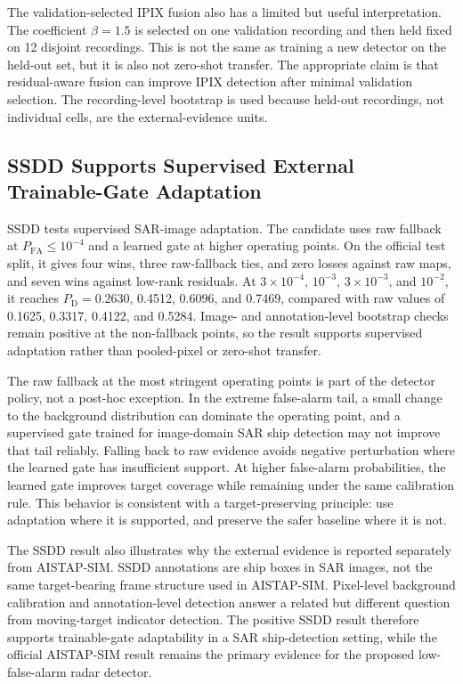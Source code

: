 \documentclass[journal]{IEEEtran}
\begin{document}
The validation-selected IPIX fusion also has a limited but useful interpretation. The coefficient $\beta=1.5$ is selected on one validation recording and then held fixed on 12 disjoint recordings. This is not the same as training a new detector on the held-out set, but it is also not zero-shot transfer. The appropriate claim is that residual-aware fusion can improve IPIX detection after minimal validation selection. The recording-level bootstrap is used because held-out recordings, not individual cells, are the external-evidence units.

\subsection{SSDD Supports Supervised External Trainable-Gate Adaptation}

SSDD tests supervised SAR-image adaptation. The candidate uses raw fallback at $P_{\mathrm{FA}}\leq10^{-4}$ and a learned gate at higher operating points. On the official test split, it gives four wins, three raw-fallback ties, and zero losses against raw maps, and seven wins against low-rank residuals. At $3\times10^{-4}$, $10^{-3}$, $3\times10^{-3}$, and $10^{-2}$, it reaches $P_{\mathrm{D}}=0.2630$, 0.4512, 0.6096, and 0.7469, compared with raw values of 0.1625, 0.3317, 0.4122, and 0.5284. Image- and annotation-level bootstrap checks remain positive at the non-fallback points, so the result supports supervised adaptation rather than pooled-pixel or zero-shot transfer.

The raw fallback at the most stringent operating points is part of the detector policy, not a post-hoc exception. In the extreme false-alarm tail, a small change to the background distribution can dominate the operating point, and a supervised gate trained for image-domain SAR ship detection may not improve that tail reliably. Falling back to raw evidence avoids negative perturbation where the learned gate has insufficient support. At higher false-alarm probabilities, the learned gate improves target coverage while remaining under the same calibration rule. This behavior is consistent with a target-preserving principle: use adaptation where it is supported, and preserve the safer baseline where it is not.

The SSDD result also illustrates why the external evidence is reported separately from AISTAP-SIM. SSDD annotations are ship boxes in SAR images, not the same target-bearing frame structure used in AISTAP-SIM. Pixel-level background calibration and annotation-level detection answer a related but different question from moving-target indicator detection. The positive SSDD result therefore supports trainable-gate adaptability in a SAR ship-detection setting, while the official AISTAP-SIM result remains the primary evidence for the proposed low-false-alarm radar detector.
\end{document}
